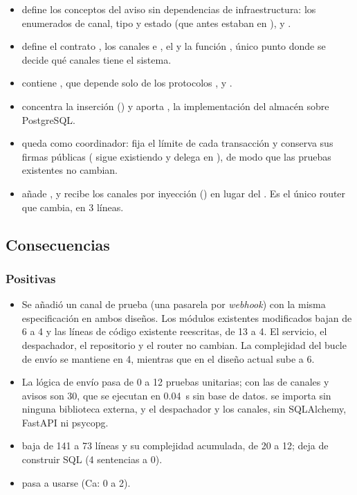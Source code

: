 \documentclass[11pt,a4paper]{article}
\begin{document}
\begin{itemize}
  \item {} define los conceptos del aviso sin dependencias de infraestructura: los enumerados de canal, tipo y estado (que antes estaban en ),  y .
  \item {} define el contrato , los canales  e , el  y la función , único punto donde se decide qué canales tiene el sistema.
  \item {} contiene , que depende solo de los protocolos ,  y .
  \item {} concentra la inserción () y aporta , la implementación del almacén sobre PostgreSQL.
  \item {} queda como coordinador: fija el límite de cada transacción y conserva sus firmas públicas ( sigue existiendo y delega en ), de modo que las pruebas existentes no cambian.
  \item {} añade , y  recibe los canales por inyección () en lugar del . Es el único router que cambia, en 3 líneas.
\end{itemize}

\subsection{Consecuencias}

\subsubsection*{Positivas}

\begin{itemize}
  \item {} Se añadió un canal de prueba (una pasarela por \emph{webhook}) con la misma especificación en ambos diseños. Los módulos existentes modificados bajan de 6 a 4 y las líneas de código existente reescritas, de 13 a 4. El servicio, el despachador, el repositorio y el router no cambian. La complejidad del bucle de envío se mantiene en 4, mientras que en el diseño actual sube a 6.
  \item {} La lógica de envío pasa de 0 a 12 pruebas unitarias; con las de canales y avisos son 30, que se ejecutan en 0.04~s sin base de datos.  se importa sin ninguna biblioteca externa, y el despachador y los canales, sin SQLAlchemy, FastAPI ni psycopg.
  \item {}  baja de 141 a 73 líneas y su complejidad acumulada, de 20 a 12; deja de construir SQL (4 sentencias a 0).
  \item {} pasa a usarse (Ca: 0 a 2).
\end{itemize}
\end{document}
